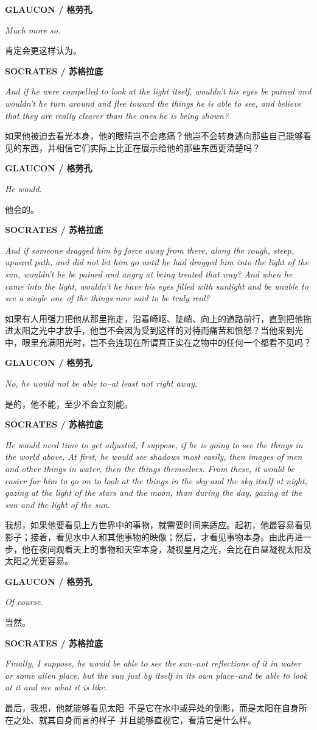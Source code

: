 \documentclass[UTF8]{ctexart}
\newcommand{\speaker}[2]{\par\medskip\noindent\textbf{#1 / #2}\par}
\newcommand{\en}[1]{\noindent\textit{#1}\par}
\newcommand{\zh}[1]{\noindent #1\par}
\begin{document}
\speaker{GLAUCON}{格劳孔}
\en{Much more so.}
\zh{肯定会更这样认为。}

\speaker{SOCRATES}{苏格拉底}
\en{And if he were compelled to look at the light itself, wouldn't his eyes be pained and wouldn't he turn around and flee toward the things he is able to see, and believe that they are really clearer than the ones he is being shown?}
\zh{如果他被迫去看光本身，他的眼睛岂不会疼痛？他岂不会转身逃向那些自己能够看见的东西，并相信它们实际上比正在展示给他的那些东西更清楚吗？}

\speaker{GLAUCON}{格劳孔}
\en{He would.}
\zh{他会的。}

\speaker{SOCRATES}{苏格拉底}
\en{And if someone dragged him by force away from there, along the rough, steep, upward path, and did not let him go until he had dragged him into the light of the sun, wouldn't he be pained and angry at being treated that way? And when he came into the light, wouldn't he have his eyes filled with sunlight and be unable to see a single one of the things now said to be truly real?}
\zh{如果有人用强力把他从那里拖走，沿着崎岖、陡峭、向上的道路前行，直到把他拖进太阳之光中才放手，他岂不会因为受到这样的对待而痛苦和愤怒？当他来到光中，眼里充满阳光时，岂不会连现在所谓真正实在之物中的任何一个都看不见吗？}

\speaker{GLAUCON}{格劳孔}
\en{No, he would not be able to--at least not right away.}
\zh{是的，他不能，至少不会立刻能。}

\speaker{SOCRATES}{苏格拉底}
\en{He would need time to get adjusted, I suppose, if he is going to see the things in the world above. At first, he would see shadows most easily, then images of men and other things in water, then the things themselves. From these, it would be easier for him to go on to look at the things in the sky and the sky itself at night, gazing at the light of the stars and the moon, than during the day, gazing at the sun and the light of the sun.}
\zh{我想，如果他要看见上方世界中的事物，就需要时间来适应。起初，他最容易看见影子；接着，看见水中人和其他事物的映像；然后，才看见事物本身。由此再进一步，他在夜间观看天上的事物和天空本身，凝视星月之光，会比在白昼凝视太阳及太阳之光更容易。}

\speaker{GLAUCON}{格劳孔}
\en{Of course.}
\zh{当然。}

\speaker{SOCRATES}{苏格拉底}
\en{Finally, I suppose, he would be able to see the sun--not reflections of it in water or some alien place, but the sun just by itself in its own place--and be able to look at it and see what it is like.}
\zh{最后，我想，他就能够看见太阳--不是它在水中或异处的倒影，而是太阳在自身所在之处、就其自身而言的样子--并且能够直视它，看清它是什么样。}
\end{document}
